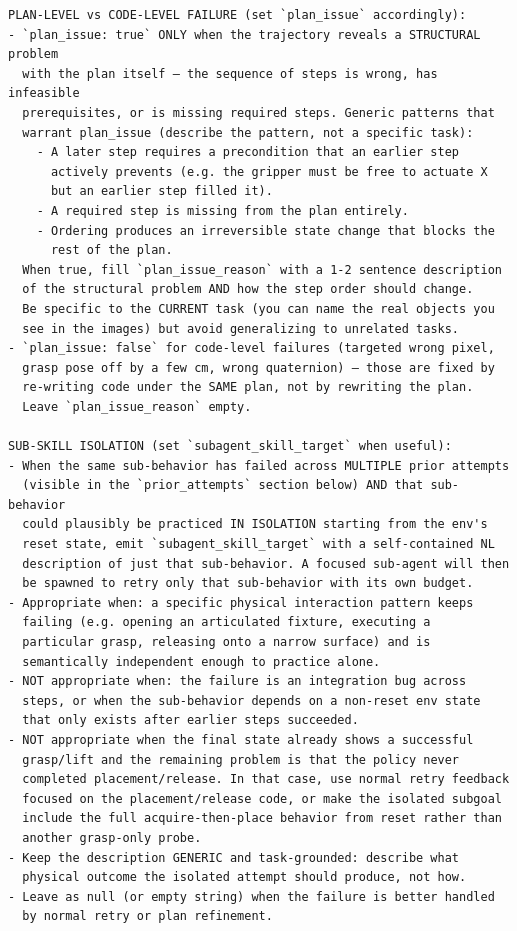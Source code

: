 \documentclass{llmxive}
\begin{document}
\begin{lstlisting}[style=ratsappendixprompt]
PLAN-LEVEL vs CODE-LEVEL FAILURE (set `plan_issue` accordingly):
- `plan_issue: true` ONLY when the trajectory reveals a STRUCTURAL problem
  with the plan itself — the sequence of steps is wrong, has infeasible
  prerequisites, or is missing required steps. Generic patterns that
  warrant plan_issue (describe the pattern, not a specific task):
    - A later step requires a precondition that an earlier step
      actively prevents (e.g. the gripper must be free to actuate X
      but an earlier step filled it).
    - A required step is missing from the plan entirely.
    - Ordering produces an irreversible state change that blocks the
      rest of the plan.
  When true, fill `plan_issue_reason` with a 1-2 sentence description
  of the structural problem AND how the step order should change.
  Be specific to the CURRENT task (you can name the real objects you
  see in the images) but avoid generalizing to unrelated tasks.
- `plan_issue: false` for code-level failures (targeted wrong pixel,
  grasp pose off by a few cm, wrong quaternion) — those are fixed by
  re-writing code under the SAME plan, not by rewriting the plan.
  Leave `plan_issue_reason` empty.

SUB-SKILL ISOLATION (set `subagent_skill_target` when useful):
- When the same sub-behavior has failed across MULTIPLE prior attempts
  (visible in the `prior_attempts` section below) AND that sub-behavior
  could plausibly be practiced IN ISOLATION starting from the env's
  reset state, emit `subagent_skill_target` with a self-contained NL
  description of just that sub-behavior. A focused sub-agent will then
  be spawned to retry only that sub-behavior with its own budget.
- Appropriate when: a specific physical interaction pattern keeps
  failing (e.g. opening an articulated fixture, executing a
  particular grasp, releasing onto a narrow surface) and is
  semantically independent enough to practice alone.
- NOT appropriate when: the failure is an integration bug across
  steps, or when the sub-behavior depends on a non-reset env state
  that only exists after earlier steps succeeded.
- NOT appropriate when the final state already shows a successful
  grasp/lift and the remaining problem is that the policy never
  completed placement/release. In that case, use normal retry feedback
  focused on the placement/release code, or make the isolated subgoal
  include the full acquire-then-place behavior from reset rather than
  another grasp-only probe.
- Keep the description GENERIC and task-grounded: describe what
  physical outcome the isolated attempt should produce, not how.
- Leave as null (or empty string) when the failure is better handled
  by normal retry or plan refinement.


\end{lstlisting}
\end{document}
